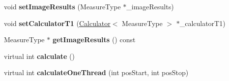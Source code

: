 \begin{DoxyCompactItemize}
\item 
\hypertarget{class_ox_1_1_image_calculator_t1_a57aa44a0e067f5747dc017be41f15d78}{void {\bfseries set\-Image\-Results} (Measure\-Type $\ast$\-\_\-image\-Results)}\label{class_ox_1_1_image_calculator_t1_a57aa44a0e067f5747dc017be41f15d78}

\item 
\hypertarget{class_ox_1_1_image_calculator_t1_aedd4a349b189cee112c8637757c733c7}{void {\bfseries set\-Calculator\-T1} (\hyperlink{class_ox_1_1_calculator}{Calculator}$<$ Measure\-Type $>$ $\ast$\-\_\-calculator\-T1)}\label{class_ox_1_1_image_calculator_t1_aedd4a349b189cee112c8637757c733c7}

\item 
\hypertarget{class_ox_1_1_image_calculator_t1_ab8670346a47b573558357787b64dc94d}{Measure\-Type $\ast$ {\bfseries get\-Image\-Results} () const }\label{class_ox_1_1_image_calculator_t1_ab8670346a47b573558357787b64dc94d}

\item 
\hypertarget{class_ox_1_1_image_calculator_t1_ad97c2f2b08a7004815445027523f97ed}{virtual int {\bfseries calculate} ()}\label{class_ox_1_1_image_calculator_t1_ad97c2f2b08a7004815445027523f97ed}

\item 
\hypertarget{class_ox_1_1_image_calculator_t1_a3ff9a9627bae210326cfbeebea097cb8}{virtual int {\bfseries calculate\-One\-Thread} (int pos\-Start, int pos\-Stop)}\label{class_ox_1_1_image_calculator_t1_a3ff9a9627bae210326cfbeebea097cb8}

\end{DoxyCompactItemize}
